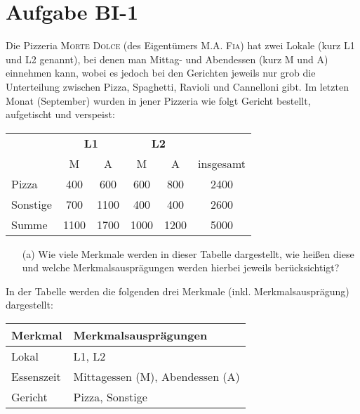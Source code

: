 
\section{Aufgabe BI-1}

\begin{task}
    Die Pizzeria \textsc{Morte Dolce} (des Eigentümers \textsc{M.A. Fia}) hat zwei Lokale (kurz L1 und L2 genannt), bei denen man Mittag- und Abendessen (kurz M und A) einnehmen kann, wobei es jedoch bei den Gerichten jeweils nur grob die Unterteilung zwischen Pizza, Spaghetti, Ravioli und Cannelloni gibt. Im letzten Monat (September) wurden in jener Pizzeria wie folgt Gericht bestellt, aufgetischt und verspeist:

    \begin{table}[H]
    \centering
    \begin{tabular}{l||cc|cc||c}
        \multirow{2}{*}{} & \multicolumn{2}{c|}{\bf{L1}}  & \multicolumn{2}{c||}{\bf{L2}} &                         \\
                          & \multicolumn{1}{c}{M}         & A    & \multicolumn{1}{c}{M}  & A           & insgesamt \\ \hline\hline
        Pizza             & \multicolumn{1}{c}{400}       & 600  & 600                    & 800         & 2400      \\
        Sonstige          & \multicolumn{1}{c}{700}       & 1100 & 400                    & 400         & 2600      \\ \hline
        Summe             & \multicolumn{1}{c}{1100}      & 1700 & 1000                   & 1200        & 5000     
    \end{tabular}
    \end{table}

    \begin{enumerate}
        \item[(a)] Wie viele Merkmale werden in dieser Tabelle dargestellt, wie heißen diese und welche Merkmalsausprägungen werden hierbei jeweils berücksichtigt?
    \end{enumerate}
\end{task}

In der Tabelle werden die folgenden drei Merkmale (inkl. Merkmalsausprägung) dargestellt:
\nopagebreak
\begin{table}[H]
\centering
\begin{tabular}{l|l}
    Merkmal & Merkmalsausprägungen \\ \hline
    Lokal & L1, L2 \\
    Essenszeit & Mittagessen (M), Abendessen (A) \\
    Gericht & Pizza, Sonstige
\end{tabular}
\end{table}


